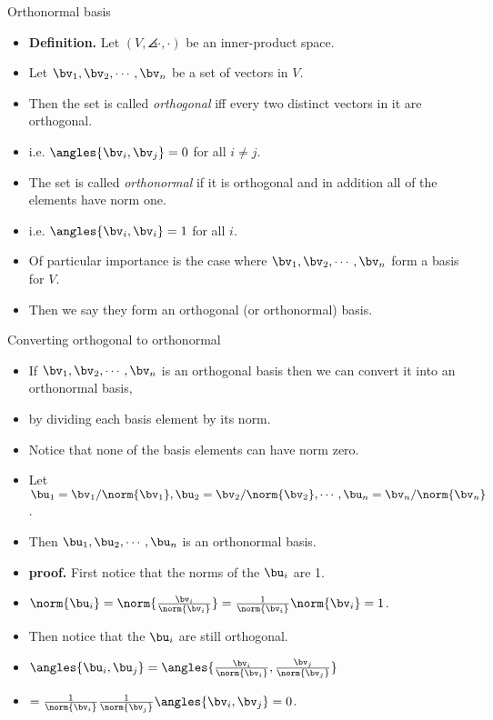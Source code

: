 \documentclass{beamer}
\begin{document}
\begin{frame}{Orthonormal basis}

\begin{itemize}
\item \textbf{Definition.} Let $\left(V, \angles{\cdot,\cdot}\right)$ be an inner-product space.
\item Let $\bv_1,\bv_2,\cdots,\bv_n$ be a set of vectors in $V$.
\item Then the set is called \emph{orthogonal} iff every two distinct vectors in it are orthogonal.
\item i.e. $\angles{\bv_i,\bv_j} = 0$ for all $i\not=j$.
\item The set is called \emph{orthonormal} if it is orthogonal and in addition all of the elements have norm one.
\item i.e. $\angles{\bv_i,\bv_i} = 1$ for all $i$.
\item Of particular importance is the case where $\bv_1,\bv_2,\cdots,\bv_n$  form a basis for $V$.
\item Then we say they form an orthogonal (or orthonormal) basis.
\end{itemize}
\end{frame}

\begin{frame}{Converting orthogonal to orthonormal}

\begin{itemize}
\item If $\bv_1,\bv_2,\cdots,\bv_n$ is an orthogonal basis then we can convert it into an orthonormal basis,
\item by dividing each basis element by its norm.
\item Notice that none of the basis elements can have norm zero.
\item Let $\bu_1 = \bv_1/\norm{\bv_1}, \bu_2=\bv_2/\norm{\bv_2},\cdots,\bu_n=\bv_n/\norm{\bv_n}$.
\item Then $\bu_1,\bu_2,\cdots,\bu_n$ is an orthonormal basis.
\item \textbf{proof.} First notice that the norms of the $\bu_i$ are 1.
\item $\norm{\bu_i} = \norm{\frac{\bv_i}{\norm{\bv_i}}} = \frac{1}{\norm{\bv_i}}\norm{\bv_i} = 1$.
\item Then notice that the $\bu_i$ are still orthogonal.
\item $\angles{\bu_i,\bu_j} = \angles{\frac{\bv_i}{\norm{\bv_i}},\frac{\bv_j}{\norm{\bv_j}}}$
\item $= \frac{1}{\norm{\bv_i}} \frac{1}{\norm{\bv_j}}\angles{\bv_i,\bv_j} = 0$.
\end{itemize}
\end{frame}
\end{document}
